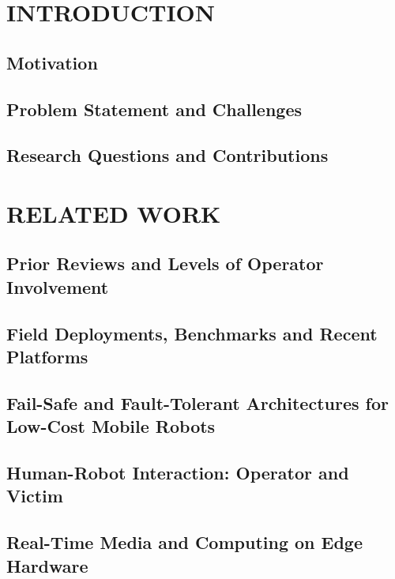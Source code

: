 

\chapter{INTRODUCTION}
\section{Motivation}
\section{Problem Statement and Challenges}
\section{Research Questions and Contributions}

\chapter{RELATED WORK}
\section{Prior Reviews and Levels of Operator Involvement}
\section{Field Deployments, Benchmarks and Recent Platforms}
\section{Fail-Safe and Fault-Tolerant Architectures for Low-Cost Mobile Robots}
\section{Human-Robot Interaction: Operator and Victim}
\section{Real-Time Media and Computing on Edge Hardware}
